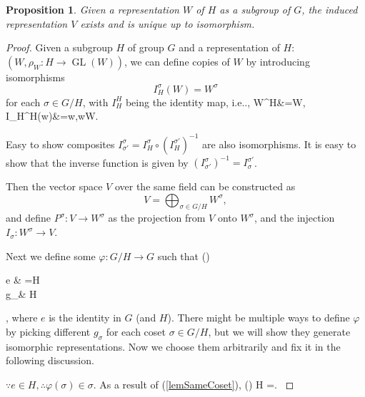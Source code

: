 \documentclass[12pt, letterpaper]{article}
\makeatletter
\newcommand{\GL}{\operatorname{GL}}
\newcommand\ie{i.e\@ifnextchar.{}{.\@}}
\newcommand{\define}{\coloneqq}
\newenvironment{eqlong}{\equation\aligned}{\endaligned\endequation}
\newtheorem{prop}{Proposition}[section]
\theoremstyle{definition}
\theoremstyle{remark}
\theoremstyle{definition}
\theoremstyle{plain}
\numberwithin{equation}{section}
\makeatother
\begin{document}
	\begin{prop}
		Given a representation $W$ of $H$ as a subgroup of $G$, the induced representation $V$ exists and is unique 
		up to isomorphism.
	\end{prop}
	\begin{proof}
		Given a subgroup $H$ of group $G$
		and a representation of $H$: $(W,\rho_W\colon H\to\GL(W))$,
		we can define copies of $W$ by introducing isomorphisms
		\[I_H^\sigma(W)=W^{\sigma}\] for each $\sigma\in G/H$, with $I_H^H$ being the identity map,
		\ie, \begin{eqlong}\label{eqIHHidm}
			W^H&=W,\\ I_H^H(w)&=w,\forall w\in W.\\
		\end{eqlong}
		
		Easy to show composites $I_{\sigma'}^{\sigma}= I_{H}^{\sigma}\circ\left( I_{H}^{\sigma'}\right)^{-1}$ are also isomorphisms.
		It is easy to show that
		the inverse function is given by $\left( I_{\sigma'}^{\sigma}\right)^{-1} =I_{\sigma}^{\sigma'}$.
		
		Then the vector space $V$ over the same field can be constructed as
		\[V=\bigoplus_{\sigma\in G/H}W^{\sigma},\]
		and define $P^{\sigma}\colon V\to W^{\sigma}$ as the projection from $V$ onto $W^\sigma$,
		and the injection $I_{\sigma}\colon W^{\sigma}\to V$.
				
		Next we define 
		 some $\varphi \colon G/H \to G$ such that
		\begin{eqlong}\label{eqVarphiSigma}
		\varphi(\sigma)\define
		\begin{cases} 
			e & \sigma=H \\
			g_\sigma\in\sigma & \sigma\ne H \\
		\end{cases},
		\end{eqlong}
		where $e$ is the identity in $G$ (and $H$).
		There might be multiple ways to define $\varphi$ by picking different $g_\sigma$ for each coset $\sigma\in G/H$,
		but we will show they generate isomorphic representations.
		Now we choose them arbitrarily and fix it in the following discussion.
		
		$\because e\in H,\therefore \varphi(\sigma)\in\sigma$.
		As a result of (\autoref{lemSameCoset}),
		\begin{eqlong}\label{eqVarphiSigmaH}
			\varphi(\sigma) H =\sigma.
		\end{eqlong}
		

\end{proof}
\end{document}
